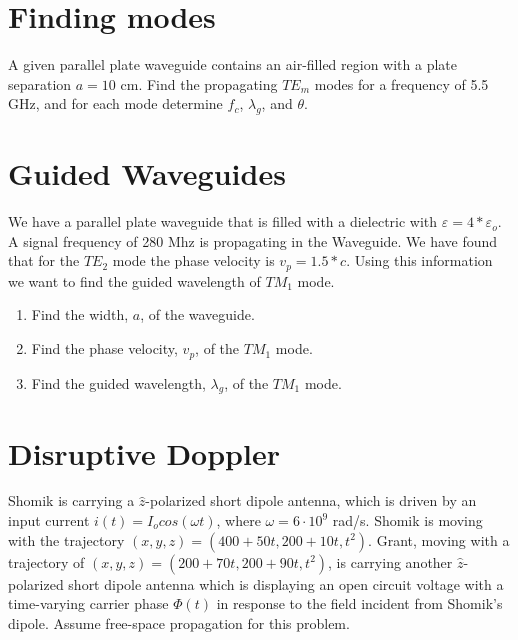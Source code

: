 \documentclass{article}
\begin{document}
\section{Finding modes}
A given parallel plate waveguide contains an air-filled region with a plate separation $a = 10$ cm. Find the propagating $TE_{m}$ modes for a frequency of 5.5 GHz, and for each mode determine $f_{c}$, $\lambda_{g}$, and $\theta$.

\section{Guided Waveguides}
We have a parallel plate waveguide that is filled with a dielectric with $\varepsilon=4*\varepsilon_{o}$. A signal frequency of 280 Mhz is propagating in the Waveguide. We have found that for the $TE_{2}$ mode the phase velocity is $v_{p} = 1.5*c$. Using this information we want to find the guided wavelength of $TM_{1}$ mode.

\begin{enumerate}[label=(\alph*)]
    \item {Find the width, $a$, of the waveguide.}

    \item {Find the phase velocity, $v_{p}$, of the $TM_{1}$ mode.}

    \item {Find the guided wavelength, $\lambda_{g}$, of the $TM_{1}$ mode.}

\end{enumerate}

\section{Disruptive Doppler}

Shomik is carrying a $\hat{z}$-polarized short dipole antenna, which is driven by an input current $i(t) = I_o cos(\omega t)$, where $\omega = 6 \cdot 10^9$ rad/s. Shomik is moving with the trajectory $(x, y, z) = (400 + 50t, 200 + 10t, t^2)$. Grant, moving with a trajectory of $(x, y, z) = (200 + 70t, 200 + 90t, t^2)$, is carrying another $\hat{z}$-polarized short dipole antenna which is displaying an open circuit voltage with a time-varying carrier phase $\Phi(t)$ in response to the field incident from Shomik's dipole. Assume free-space propagation for this problem.
\end{document}
